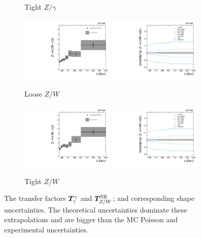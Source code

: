 \begin{figure}[]
\begin{center}
\begin{subfigure}[t]{0.49\textwidth}
            \caption{Tight $Z/\gamma$}
        \end{subfigure}
        \begin{subfigure}[t]{0.49\textwidth}
            \includegraphics[width=0.49\textwidth]{figures/monotop/xfer/rfactor_wz_loose.pdf}
            \includegraphics[width=0.49\textwidth]{figures/monotop/uncertainties/variations_wz_loose.pdf}
            \caption{Loose $Z/W$}
        \end{subfigure}
        \begin{subfigure}[t]{0.49\textwidth}
            \includegraphics[width=0.49\textwidth]{figures/monotop/xfer/rfactor_wz.pdf}
            \includegraphics[width=0.49\textwidth]{figures/monotop/uncertainties/variations_wz.pdf}
            \caption{Tight $Z/W$}
        \end{subfigure}
        \caption{The transfer factors $\bm{T}^{\gamma}_{\gamma}$ and $\bm{T}^{\mathrm{SR}}_{Z/W}$; and corresponding shape uncertainties.
                 The theoretical uncertainties dominate these extrapolations and are bigger than the MC Poisson and experimental uncertainties.
        }
        \label{fig:mt:theory_xfer}
    \end{center}
\end{figure}

